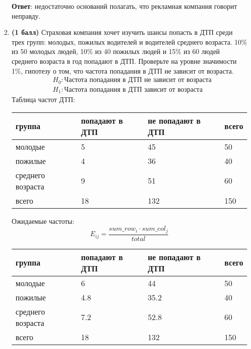 \documentclass{assignment}
\begin{document}
\begin{enumerate}
    \textbf{Ответ}: недостаточно оснований полагать, что рекламная компания говорит неправду.
    \finish

    \item \textbf{(1 балл)} Страховая компания хочет изучить шансы попасть в ДТП среди трех групп: молодых, пожилых водителей и водителей среднего возраста. 10\% из 50 молодых людей, 10\% из 40 пожилых людей и 15\% из 60 людей среднего возраста в год попадают в ДТП. Проверьте на уровне значимости 1\%, гипотезу о том, что частота попадания в ДТП не зависит от возраста.
    \start
    \begin{align*}
        &H_0: \text{Частота попадания в ДТП не зависит от возраста} \\
        &H_1: \text{Частота попадания в ДТП зависит от возраста}
    \end{align*}
    Таблица частот ДТП:
    \begin{table}[h!]
        \begin{tabular}{|l|l|l|l|}
        \hline
        группа            & попадают в ДТП & не попадают в ДТП & всего \\ \hline
        молодые           & 5              & 45                & 50    \\ \hline
        пожилые           & 4              & 36                & 40    \\ \hline
        среднего возраста & 9              & 51                & 60    \\ \hline
        всего             & 18             & 132               & 150   \\ \hline
        \end{tabular}
    \end{table}
    
    Ожидаемые частоты:
    \begin{equation}
        E_{ij} = \frac{sum\_row_i\cdot sum\_col_j}{total}
    \end{equation}
    \begin{table}[h!]
        \begin{tabular}{|l|l|l|l|}
        \hline
        группа            & попадают в ДТП & не попадают в ДТП & всего \\ \hline
        молодые           & 6              & 44                & 50    \\ \hline
        пожилые           & 4.8              & 35.2                & 40    \\ \hline
        среднего возраста & 7.2              & 52.8                & 60    \\ \hline
        всего             & 18             & 132               & 150   \\ \hline
        \end{tabular}
    \end{table}
    

\end{enumerate}
\end{document}
